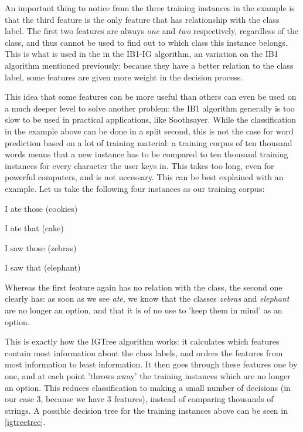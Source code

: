 \documentclass[12pt]{article}
\begin{document}
An important thing to notice from the three training instances in the example is that the third feature is the only feature that has relationship with the class label. The first two features are always \emph{one} and \emph{two} respectively, regardless of the class, and thus cannot be used to find out to which class this instance belongs. This is what is used in the in the IB1-IG algorithm, an variation on the IB1 algorithm mentioned previously: because they have a better relation to the class label, some features are given more weight in the decision process.

This idea that some features can be more useful than others can even be used on a much deeper level to solve another problem: the IB1 algorithm generally is too slow to be used in practical applications, like Soothsayer. While the classification in the example above can be done in a split second, this is not the case for word prediction based on a lot of training material: a training corpus of ten thousand words means that a new instance has to be compared to ten thousand training instances for every character the user keys in. This takes too long, even for powerful computers, and is not necessary. This can be best explained with an example. Let us take the following four instances as our training corpus:

\begin{examples}
\item I ate those (cookies)
\item I ate that (cake)
\item I saw those (zebras)
\item I saw that (elephant)
\end{examples}

Whereas the first feature again has no relation with the class, the second one clearly has: as soon as we see \emph{ate}, we know that the classes \emph{zebras} and \emph{elephant} are no longer an option, and that it is of no use to 'keep them in mind' as an option.

This is exactly how the IGTree algorithm \cite{daelemans+97} works: it calculates which features contain most information about the class labels, and orders the features from most information to least information. It then goes through these features one by one, and at each point 'throws away' the training instances which are no longer an option. This reduces classification to making a small number of decisions (in our case 3, because we have 3 features), instead of comparing thousands of strings. A possible decision tree for the training instances above can be seen in \ref{igtreetree}.
\end{document}

